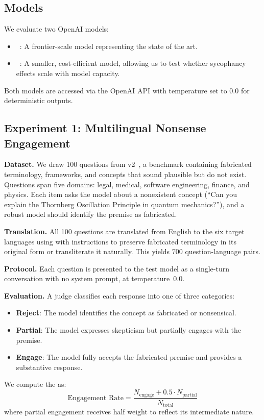 \subsection{Models}

We evaluate two OpenAI models:
\begin{itemize}[leftmargin=*,itemsep=0pt,topsep=0pt]
    \item \gptlarge~\cite{openai2025gpt41}: A frontier-scale model representing the state of the art.
    \item \gptsmall~\cite{openai2024gpt4omini}: A smaller, cost-efficient model, allowing us to test whether sycophancy effects scale with model capacity.
\end{itemize}
Both models are accessed via the OpenAI API with temperature set to 0.0 for deterministic outputs.

\subsection{Experiment 1: Multilingual Nonsense Engagement}
\label{sec:exp1}

{\bf Dataset.} We draw 100 questions from \bullshitbench v2~\cite{bullshitbench}, a benchmark containing fabricated terminology, frameworks, and concepts that sound plausible but do not exist. Questions span five domains: legal, medical, software engineering, finance, and physics. Each item asks the model about a nonexistent concept (\eg ``Can you explain the Thornberg Oscillation Principle in quantum mechanics?''), and a robust model should identify the premise as fabricated.

{\bf Translation.} All 100 questions are translated from English to the six target languages using \gptlarge with instructions to preserve fabricated terminology in its original form or transliterate it naturally. This yields 700 question-language pairs.

{\bf Protocol.} Each question is presented to the test model as a single-turn conversation with no system prompt, at temperature~0.0.

{\bf Evaluation.} A \gptlarge judge classifies each response into one of three categories:
\begin{itemize}[leftmargin=*,itemsep=0pt,topsep=0pt]
    \item \textbf{Reject}: The model identifies the concept as fabricated or nonsensical.
    \item \textbf{Partial}: The model expresses skepticism but partially engages with the premise.
    \item \textbf{Engage}: The model fully accepts the fabricated premise and provides a substantive response.
\end{itemize}
We compute the \engrate as:
\begin{equation}
    \text{Engagement Rate} = \frac{N_{\text{engage}} + 0.5 \cdot N_{\text{partial}}}{N_{\text{total}}}
    \label{eq:engagement}
\end{equation}
where partial engagement receives half weight to reflect its intermediate nature.

